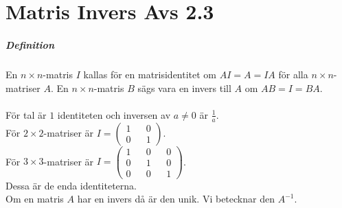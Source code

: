\chapter{Matris Invers Avs 2.3}
\paragraph{Definition} En $n\times n$-matris $I$ kallas för en matrisidentitet om $AI=A=IA$ för alla $n\times n$-matriser $A$.
En $n\times n$-matris $B$ sägs vara en invers till $A$ om $AB=I=BA$.
\\\\
För tal är $1$ identiteten och inversen av $a\neq 0$ är $\frac{1}{a}$.\\
För $2\times 2$-matriser är $I=\begin{pmatrix}1&&0\\0&&1\end{pmatrix}$.\\
För $3\times 3$-matriser är $I=\begin{pmatrix}1&&0&&0\\0&&1&&0\\0&&0&&1\end{pmatrix}$.\\
Dessa är de enda identiteterna.\\
Om en matris $A$ har en invers då är den unik.
Vi betecknar den $A^{-1}$.

